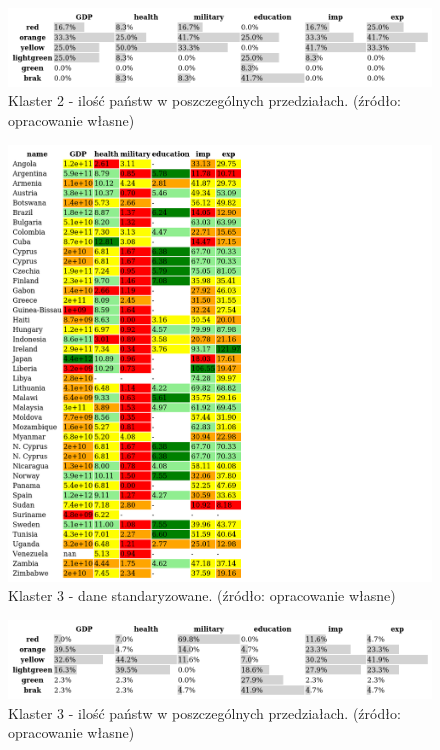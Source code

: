 \documentclass[11pt]{report}
\begin{document}
    \begin{figure}[ht!]
        \centering
        \includegraphics[width=1 \textwidth]{tables/CLUST/cluster2stdkmeanscount.png}
        \caption{Klaster 2 - ilość państw w poszczególnych przedziałach. (źródło: opracowanie własne)}
        \label{tab:cl2stdcount}
    \end{figure}

    

    \begin{figure}[ht!]
        \centering
        \includegraphics[width=1 \textwidth]{tables/CLUST/cluster3stdkmeans.png}
        \caption{Klaster 3 - dane standaryzowane. (źródło: opracowanie własne)}
        \label{tab:cl3std}
    \end{figure}
    

    \begin{figure}[ht!]
        \centering
        \includegraphics[width=1 \textwidth]{tables/CLUST/cluster3stdkmeanscount.png}
        \caption{Klaster 3 - ilość państw w poszczególnych przedziałach. (źródło: opracowanie własne)}
        \label{tab:cl3stdcount}
    \end{figure}
\end{document}
